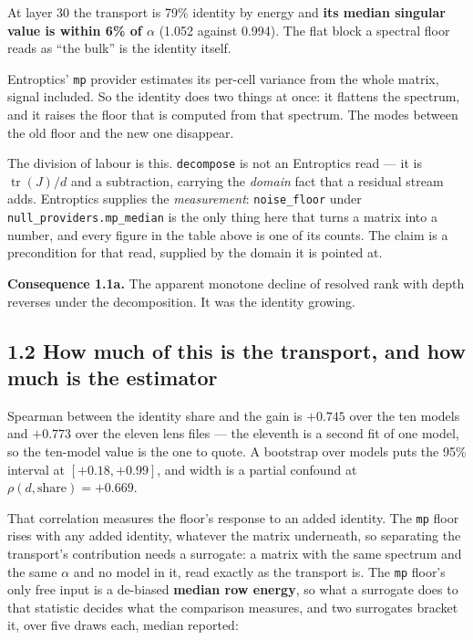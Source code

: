 \documentclass[10pt,letterpaper,twocolumn]{article}
\begin{document}
At layer 30 the transport is 79\% identity by energy and \textbf{its median singular value is within 6\%
of \(\alpha\)} (1.052 against 0.994). The flat block a spectral floor reads as ``the bulk'' is the
identity itself.

Entroptics' \texttt{mp} provider estimates its per-cell variance from the whole matrix, signal included.
So the identity does two things at once: it flattens the spectrum, and it raises the floor that is
computed from that spectrum. The modes between the old floor and the new one disappear.

The division of labour is this.
\texttt{decompose} is not an Entroptics read --- it is \(\operatorname{tr}(J)/d\) and a subtraction, carrying
the \emph{domain} fact that a residual stream adds. Entroptics supplies the \emph{measurement}: \texttt{noise\_\allowbreak{}floor}
under \texttt{null\_\allowbreak{}providers.\allowbreak{}mp\_\allowbreak{}median} is the only thing here that turns a matrix into a number, and every
figure in the table above is one of its counts. The claim is a precondition for that read, supplied
by the domain it is pointed at.

\textbf{Consequence 1.1a.} The apparent monotone decline of resolved rank with depth reverses under the
decomposition. It was the identity growing.

\subsection{1.2 How much of this is the transport, and how much is the estimator}\label{12-how-much-of-this-is-the-transport-and-how-much-is-the-estimator}

Spearman between the identity share and the gain is \(+0.745\) over the ten models and \(+0.773\) over
the eleven lens files --- the eleventh is a second fit of one model, so the ten-model value is the
one to quote. A bootstrap over models puts the 95\% interval at \([+0.18, +0.99]\), and width is a
partial confound at \(\rho(d, \text{share})=+0.669\).

That correlation measures the floor's response to an added identity. The \texttt{mp} floor rises with any
added identity, whatever the matrix underneath, so separating the transport's contribution needs a
surrogate: a matrix with the same spectrum and the same \(\alpha\) and no model in it, read exactly
as the transport is. The \texttt{mp} floor's only free input is a de-biased \textbf{median row energy}, so what
a surrogate does to that statistic decides what the comparison measures, and two surrogates bracket
it, over five draws each, median reported:
\end{document}
